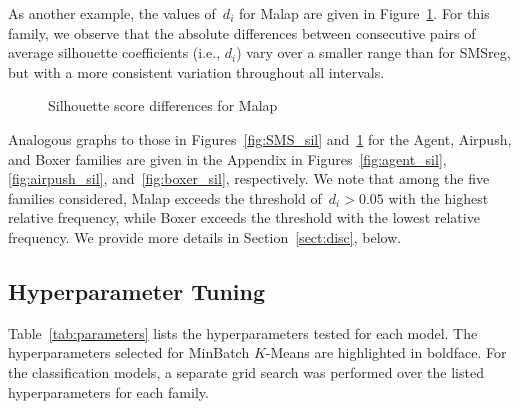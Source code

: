 \documentclass[12pt]{article}
\begin{document}
As another example, the values of~$d_i$ for Malap are given in Figure~\ref{fig:malap_sil}. 
For this family, we observe that the absolute differences between consecutive
pairs of average silhouette coefficients (i.e., $d_i$) vary over a smaller range than
for SMSreg, but with a more consistent variation throughout all intervals.


\begin{figure}[!htb]
    \centering
    
    \caption{Silhouette score differences for Malap}\label{fig:malap_sil}
\end{figure}

Analogous graphs to those in Figures~\ref{fig:SMS_sil} and~\ref{fig:malap_sil}
for the Agent, Airpush, and Boxer families are
given in the Appendix in Figures~\ref{fig:agent_sil}, 
\ref{fig:airpush_sil}, and~\ref{fig:boxer_sil}, respectively. 
We note that among the five families considered,
Malap exceeds the threshold of~$d_i > 0.05$
with the highest relative frequency, while
Boxer exceeds the threshold with the lowest
relative frequency. We provide more details
in Section~\ref{sect:disc}, below.

\subsection{Hyperparameter Tuning}

Table~\ref{tab:parameters} lists the hyperparameters tested for each model.
The hyperparameters selected for MinBatch $K$-Means are highlighted in boldface. 
For the classification models, a separate grid search was performed over the listed 
hyperparameters for each family.
\end{document}

